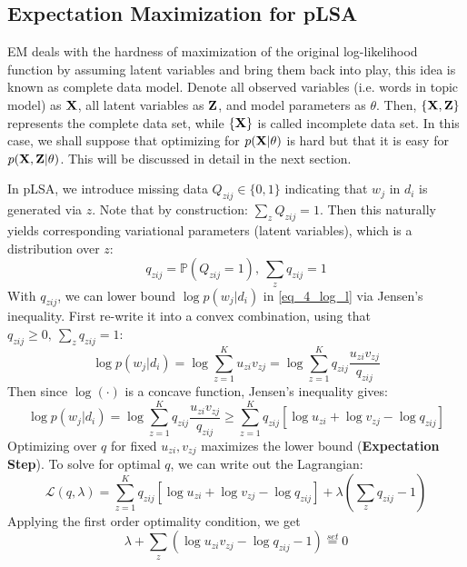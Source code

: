 \documentclass[../book-template.tex]{subfiles}
\begin{document}
\subsection{Expectation Maximization for pLSA}
EM deals with the hardness of maximization of the original log-likelihood function by assuming latent variables and bring them back into play, this idea is known as complete data model. Denote all observed variables (i.e. words in topic model) as ${\bf X}$, all latent variables as ${\bf Z}$, and model parameters as $\theta$. Then, $\{{\bf X, Z}\}$ represents the complete data set, while $\{{\bf X}\}$ is called incomplete data set. In this case, we shall suppose that optimizing for $p({\bf X}|\theta)$ is hard but that it is easy for $p({\bf X, Z}|\theta)$. This will be discussed in detail in the next section.
\par In pLSA, we introduce missing data $Q_{zij}\in\{0,1\}$ indicating that $w_j$ in $d_i$ is generated via $z$. Note that by construction: $\sum_{z}Q_{zij}=1$. Then this naturally yields corresponding variational parameters (latent variables), which is a distribution over $z$:
\begin{equation*}
	q_{zij}=\mathbb{P}(Q_{zij}=1),\ \sum_{z} q_{zij}=1
\end{equation*}
With $q_{zij}$, we can lower bound $\log p(w_j|d_i)$ in \eqref{eq_4_log_l} via Jensen's inequality. First re-write it into a convex combination, using that $q_{zij}\geq 0,\ \sum_{z} q_{zij}=1$:
\begin{equation*}
	\log p(w_j|d_i) = \log \sum_{z=1}^{K} u_{zi}v_{zj} =  \log \sum_{z=1}^{K} q_{zij}\frac{u_{zi}v_{zj}}{q_{zij}}
\end{equation*}
Then since $\log(\cdot)$ is a concave function, Jensen's inequality gives:
\begin{equation}\label{eq_4_lwb}
	\log p(w_j|d_i) =\log \sum_{z=1}^{K} q_{zij}\frac{u_{zi}v_{zj}}{q_{zij}} \geq \sum_{z=1}^{K} q_{zij}[\log u_{zi} + \log v_{zj} - \log q_{zij}]
\end{equation}
Optimizing over $q$ for fixed $u_{zi},v_{zj}$ maximizes the lower bound (\textbf{Expectation Step}). To solve for optimal $q$, we can write out the Lagrangian:
\begin{equation*}
	\mathcal{L}(q, \lambda) = \sum_{z=1}^{K} q_{zij}[\log u_{zi} + \log v_{zj} - \log q_{zij}] + \lambda (\sum_{z} q_{zij}-1)
\end{equation*}
Applying the first order optimality condition, we get
\begin{equation*}
	\lambda + \sum_{z} (\log u_{zi}v_{zj} - \log q_{zij} -1) \overset{set}{=}0
\end{equation*}
\end{document}
